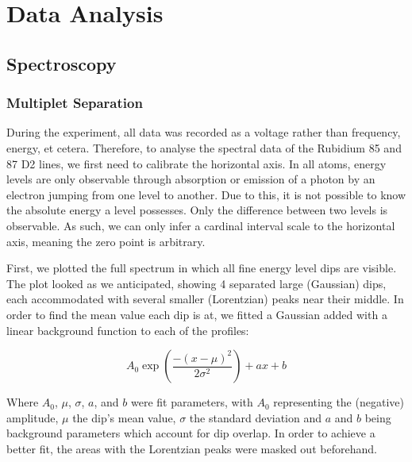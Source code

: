 \documentclass[12pt, a4paper]{article}
\let\oldexp\exp
\renewcommand{\exp}[1]{\ensuremath{\oldexp \left( #1 \right)}}
\begin{document}

\section{Data Analysis}
\subsection{Spectroscopy}
\subsubsection{Multiplet Separation}

During the experiment, all data was recorded as a voltage rather than frequency, energy, et cetera. Therefore, to analyse the spectral data of the Rubidium 85 and 87 D2 lines, we first need to calibrate the horizontal axis. In all atoms, energy levels are only observable through absorption or emission of a photon by an electron jumping from one level to another. Due to this, it is not possible to know the absolute energy a level possesses. Only the difference between two levels is observable. As such, we can only infer a cardinal interval scale to the horizontal axis, meaning the zero point is arbitrary.

First, we plotted the full spectrum in which all fine energy level dips are visible. The plot looked as we anticipated, showing 4 separated large (Gaussian) dips, each accommodated with several smaller (Lorentzian) peaks near their middle. In order to find the mean value each dip is at, we fitted a Gaussian added with a linear background function to each of the profiles:

\begin{equation}
A_0 \exp{\frac{-(x - \mu)^2}{2 \sigma^2}} + ax + b
\label{gaussianfit}
\end{equation}

Where $A_0$, $\mu$, $\sigma$, $a$, and $b$ were fit parameters, with $A_0$ representing the (negative) amplitude, $\mu$ the dip's mean value, $\sigma$ the standard deviation and $a$ and $b$ being background parameters which account for dip overlap. In order to achieve a better fit, the areas with the Lorentzian peaks were masked out beforehand.
\end{document}
